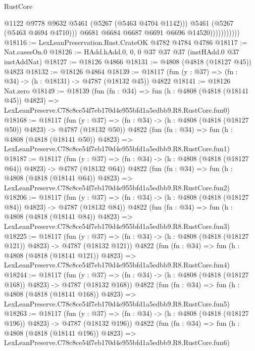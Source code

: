 \begin{lexlean}{RustCore}
\begin{coremodule}
                              @1122
                              @9778
                              @9632
                              @5461
                              (@5267 (@5463 @4704 @1142)))
                            @5461
                            (@5267 (@5463 @4694 @4710)))
                          @6681
                          @6684
                          @6687
                          @6691
                          @6696
                          @14520)))))))))))
@18116 := LexLeanPreservation.Rust.CrateOK @4782 @4784 @4786
@18117 := Nat.casesOn.{0}
@18126 := HAdd.hAdd.{0, 0, 0} @37 @37 @37 (instHAdd.{0} @37 instAddNat)
@18127 := @18126 @4866
@18131 := @4808 (@4818 (@18127 @45)) @4823
@18132 := @18126 @4864
@18139 := @18117 (fun (y : @37) => (fn : @34) -> (h : @18131) -> @4787 (@18132 @45)) @4822
@18141 := @18126 Nat.zero
@18149 := @18139
    (fun (fn : @34) =>
    fun (h : @4808 (@4818 (@18141 @45)) @4823) =>
    LexLeanPreserve.C78c8ce54f7eb170d4e955bfd1a5edbb9.R8.RustCore.fun0)
@18168 := @18117
    (fun (y : @37) => (fn : @34) -> (h : @4808 (@4818 (@18127 @50)) @4823) -> @4787 (@18132 @50))
    @4822
    (fun (fn : @34) =>
    fun (h : @4808 (@4818 (@18141 @50)) @4823) =>
    LexLeanPreserve.C78c8ce54f7eb170d4e955bfd1a5edbb9.R8.RustCore.fun1)
@18187 := @18117
    (fun (y : @37) => (fn : @34) -> (h : @4808 (@4818 (@18127 @64)) @4823) -> @4787 (@18132 @64))
    @4822
    (fun (fn : @34) =>
    fun (h : @4808 (@4818 (@18141 @64)) @4823) =>
    LexLeanPreserve.C78c8ce54f7eb170d4e955bfd1a5edbb9.R8.RustCore.fun2)
@18206 := @18117
    (fun (y : @37) => (fn : @34) -> (h : @4808 (@4818 (@18127 @84)) @4823) -> @4787 (@18132 @84))
    @4822
    (fun (fn : @34) =>
    fun (h : @4808 (@4818 (@18141 @84)) @4823) =>
    LexLeanPreserve.C78c8ce54f7eb170d4e955bfd1a5edbb9.R8.RustCore.fun3)
@18225 := @18117
    (fun (y : @37) => (fn : @34) -> (h : @4808 (@4818 (@18127 @121)) @4823) -> @4787 (@18132 @121))
    @4822
    (fun (fn : @34) =>
    fun (h : @4808 (@4818 (@18141 @121)) @4823) =>
    LexLeanPreserve.C78c8ce54f7eb170d4e955bfd1a5edbb9.R8.RustCore.fun4)
@18244 := @18117
    (fun (y : @37) => (fn : @34) -> (h : @4808 (@4818 (@18127 @168)) @4823) -> @4787 (@18132 @168))
    @4822
    (fun (fn : @34) =>
    fun (h : @4808 (@4818 (@18141 @168)) @4823) =>
    LexLeanPreserve.C78c8ce54f7eb170d4e955bfd1a5edbb9.R8.RustCore.fun5)
@18263 := @18117
    (fun (y : @37) => (fn : @34) -> (h : @4808 (@4818 (@18127 @196)) @4823) -> @4787 (@18132 @196))
    @4822
    (fun (fn : @34) =>
    fun (h : @4808 (@4818 (@18141 @196)) @4823) =>
    LexLeanPreserve.C78c8ce54f7eb170d4e955bfd1a5edbb9.R8.RustCore.fun6)

\end{coremodule}
\end{lexlean}
